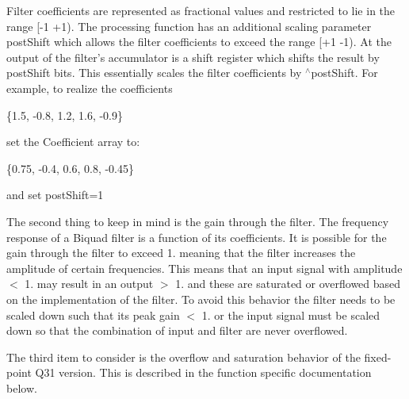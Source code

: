 \begin{DoxyParagraph}{}
Filter coefficients are represented as fractional values and restricted to lie in the range {\ttfamily \mbox{[}-\/1 +1)}. The processing function has an additional scaling parameter {\ttfamily post\-Shift} which allows the filter coefficients to exceed the range {\ttfamily \mbox{[}+1 -\/1)}. At the output of the filter's accumulator is a shift register which shifts the result by {\ttfamily post\-Shift} bits.  This essentially scales the filter coefficients by {$^\wedge$post\-Shift}. For example, to realize the coefficients 
\begin{DoxyPre}   
   \{1.5, -0.8, 1.2, 1.6, -0.9\}   
\end{DoxyPre}
 set the Coefficient array to\-: 
\begin{DoxyPre}   
   \{0.75, -0.4, 0.6, 0.8, -0.45\}   
\end{DoxyPre}
 and set {\ttfamily post\-Shift=1}
\end{DoxyParagraph}
\begin{DoxyParagraph}{}
The second thing to keep in mind is the gain through the filter. The frequency response of a Biquad filter is a function of its coefficients. It is possible for the gain through the filter to exceed 1. meaning that the filter increases the amplitude of certain frequencies. This means that an input signal with amplitude $<$ 1. may result in an output $>$ 1. and these are saturated or overflowed based on the implementation of the filter. To avoid this behavior the filter needs to be scaled down such that its peak gain $<$ 1. or the input signal must be scaled down so that the combination of input and filter are never overflowed.
\end{DoxyParagraph}
\begin{DoxyParagraph}{}
The third item to consider is the overflow and saturation behavior of the fixed-\/point Q31 version. This is described in the function specific documentation below. 
\end{DoxyParagraph}



